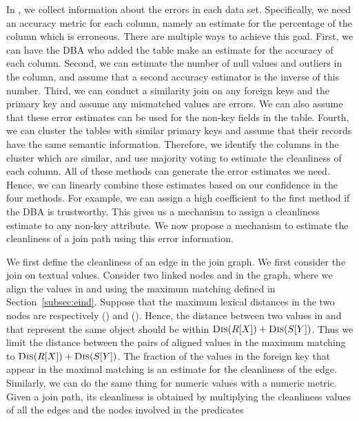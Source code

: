 In \dcv, we collect information about the errors in each data set. Specifically, we need an accuracy metric for each column, namely an estimate for the percentage of the column which is erroneous. There are multiple ways to achieve this goal. First, we can have the DBA who added the table make an estimate for the accuracy of each column. Second, we can estimate the number of null values and outliers in the column, and assume that a second accuracy estimator is the inverse of this number. Third, we can conduct a similarity join on any foreign keys and the primary key and assume any mismatched values are errors. We can also assume that these error estimates can be used for the non-key fields in the table. Fourth, we can cluster the tables with similar primary keys and assume that their records have the same semantic information.  Therefore, we identify the columns in the cluster which are similar, and use majority voting to estimate the cleanliness of each column. All of these methods can generate the  error estimates we need. Hence, we can linearly combine these estimates based on our confidence in the four methods. For example, we can assign a high coefficient to the first method if the DBA is trustworthy. This gives us a mechanism to assign a cleanliness estimate to any non-key attribute. We now propose a mechanism to estimate the cleanliness of a join path using this error information.


We first define the cleanliness of an edge in the join graph. We first consider the join on textual values. Consider two linked nodes \RX and \SY in the graph, where we align the values in \RX and \SY using the maximum matching defined in Section~\ref{subsec:eind}. Suppose that the maximum lexical distances in the two nodes are respectively \Dis(\RX) and \Dis(\SY). Hence, the distance between two values in \RX and \SY that represent the same object should be within $\textsc{Dis}(R[X])+\textsc{Dis}(S[Y])$. Thus we limit the distance between the pairs of aligned values in the maximum matching to $\textsc{Dis}(R[X])+\textsc{Dis}(S[Y])$. The fraction of the values in the foreign key that appear in the maximal matching is an estimate for the cleanliness of the edge. Similarly, we can do the same thing for numeric values with a numeric metric.
Given a join path, its cleanliness is obtained by multiplying the cleanliness values of all the edges and the nodes involved in the predicates 

